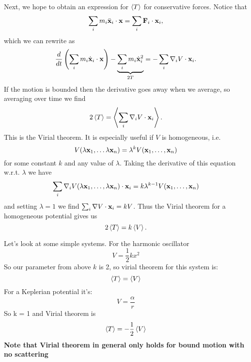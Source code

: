 Next, we hope to obtain an expression for $\left< T \right>$ for conservative forces. Notice that 
\begin{equation}
\sum_i m_i \ddot{\mathbf{x}}_i \cdot \mathbf{x} = \sum_i \mathbf{F}_i \cdot \mathbf{x}_i,
\end{equation}
which we can rewrite as 
\begin{equation}
\frac{d}{dt} \left( \sum_i m_i \dot{\mathbf{x}}_i \cdot \mathbf{x} \right) - \underbrace{\sum_i m_i \dot{\mathbf{x}}_i^2}_{2T} = - \sum_i \mathbf{\nabla}_i V \cdot \mathbf{x}_i.
\end{equation}
If the motion is bounded then the derivative goes away when we average, so averaging over time we find
\begin{equation}
2 \left< T \right> = \left<  \sum_i \mathbf{\nabla}_i V \cdot \mathbf{x}_i  \right>.
\end{equation}
This is the Virial theorem. It is especially useful if $V$ is homogeneous, i.e. 
\begin{equation}
V(\lambda \mathbf{x}_1, \dots \lambda \mathbf{x}_n) = \lambda^k V(\mathbf{x}_1, \dots, \mathbf{x}_n)
\end{equation}
for some constant $k$ and any value of $\lambda$. Taking the derivative of this equation w.r.t. $\lambda$ we have
\begin{equation}
\sum_i \mathbf{\nabla}_i V(\lambda \mathbf{x}_1, \dots, \lambda \mathbf{x}_n) \cdot \mathbf{x}_i = k \lambda^{k-1} V(\mathbf{x}_1, \dots, \mathbf{x}_n)
\end{equation}
and setting $\lambda = 1$ we find $\sum_i \mathbf{\nabla} V \cdot \mathbf{x}_i = k V$. Thus the Virial theorem for a homogeneous potential gives us
\begin{equation}
2 \left< T \right> = k \left< V \right>.
\end{equation}

Let's look at some simple systems. For the harmonic oscillator
\begin{equation}
V = \frac{1}{2} kx^2
\end{equation}
So our parameter from above $k$ is 2, so virial theorem for this system is:
\begin{equation}
\left< T \right> = \left< V \right>
\end{equation}
For a Keplerian potential it's:
\begin{equation}
V = \frac{\alpha}{r}
\end{equation}
So k = 1 and Virial theorem is
\begin{equation}
\left< T \right> = -\frac{1}{2} \left< V \right>
\end{equation}
\textbf{Note that Virial theorem in general only holds for bound motion with no scattering}


